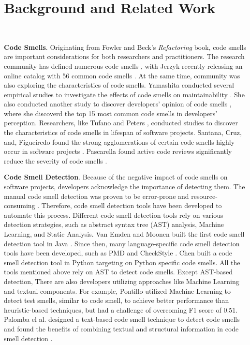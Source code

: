 \vspace*{-0.5em}

\section{Background and Related Work}~\label{sec:background}

\vspace*{-1em}


{\bf Code Smells}. Originating from Fowler and Beck's \textit{Refactoring} book,
code smells are important considerations for both researchers and practitioners.
The research community has defined numerous code smells
\cite{Pysmell,SQLAntipatterns,CleanCode,RefactoringWorkbook}, with Jerzyk
recently releasing an online catalog with 56 common code smells
\cite{Jerzyk2023}. At the same time, community was also exploring the
characteristics of code smells. Yamashita conducted several empirical studies to
investigate the effects of code smells on maintainability \cite{6392174}
\cite{6405287}. She also conducted another study to discover developers' opinion
of code smells \cite{developersCare}, where she discoverd the top 15 most common
code smells in developers' perception. Researchers, like Tufano
\cite{whenandwhy} and Peters \cite{lifespan}, conducted studies to discover the
characteristics of code smells in lifespan of software projects. Santana, Cruz,
and, Figueiredo found the strong agglomerations of certain code smells highly
occur in software projects \cite{Santana}. Pascarella found active code reviews
significantly reduce the severity of code smells \cite{Pascarella}.

{\bf Code Smell Detection}. Because of the negative impact of code smells on
software projects, developers acknowledge the importance of detecting them. The
manual code smell detection was proven to be error-prone and resource-consuming
\cite{DetectingDefectsInObject}. Therefore, code smell detection tools have been
developed to automate this process. Different code smell detection tools rely on
various detection strategies, such as abstract syntax tree (AST) analysis,
Machine Learning, and Static Analysis. Van Emden and Moonen built the first code
smell detection tool in Java \cite{1173068}. Since then, many language-specific
code smell detection tools have been developed, such as PMD \cite{PMD} and
CheckStyle \cite{CheckStyle}. Chen \cite{Pysmell} built a code smell detection
tool in Python targeting on Python specific code smells. All the tools mentioned
above rely on AST to detect code smells. Except AST-based detection, There are
also developers utilizing approaches like Machine Learning and textual
components. For example, Pontillo utilized Machine Learning to detect test
smells, similar to code smell, to achieve better performance than
heuristic-based techniques, but had a challenge of overcoming F1 score of 0.51.
Palomba el al. designed a text-based code smell technique to detect code smells
and found the benefits of combining textual and structural information in code
smell detection \cite{Palomba}.

